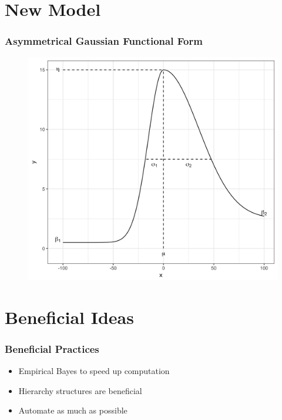 \documentclass{beamer}\usepackage[]{graphicx}\usepackage[]{color}
\begin{document}
\section{New Model}
\begin{frame}
\frametitle{Asymmetrical Gaussian Functional Form}
\begin{figure}[!ht]
  \includegraphics[width=0.70\linewidth]{Figures/ASGFunctFormPlot.png}
\end{figure}

\end{frame}



\section{Beneficial Ideas}
\begin{frame}
\frametitle{Beneficial Practices}

\begin{itemize}
\item Empirical Bayes to speed up computation
\item Hierarchy structures are beneficial
\item Automate as much as possible
\end{itemize}

\end{frame}
\end{document}
